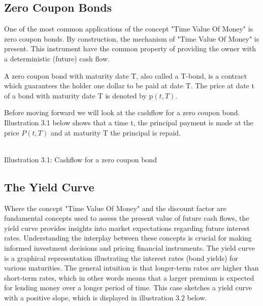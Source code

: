 \subsection{Zero Coupon Bonds}
One of the most common applications of the concept "Time Value Of Money" is zero coupon bonds. 
By construction, the mechanism of "Time Value Of Money" is present. This instrument 
have the common property of providing the owner with a deterministic (future) cash flow. 
\begin{definition}\label{def:zcb}
    A zero coupon bond with maturity date T, also called a T-bond, is a contract which 
    guarantees the holder one dollar to be paid at date T. The price at date t of 
    a bond with maturity date T is denoted by p$(t,T)$. \cite{Bjork} 
\end{definition} 
\noindent
Before moving forward we will look at the cashflow for a zero coupon bond. Illustration  3.1 below shows that a time t,
the principal payment is made at the price $P(t,T)$ and at maturity T the principal is repaid.
\begin{center}
    \\[10pt] 
    Illustration 3.1: Cashflow for a zero coupon bond
\end{center}

\subsection{The Yield Curve}
Where the concept "Time Value Of Money" and the discount factor are fundamental concepts used to assess the present value of future
cash flows, the yield curve provides insights into market expectations regarding future interest rates.
Understanding the interplay between these concepts is crucial for making informed investment decisions and pricing
financial instruments. The yield curve is a graphical representation illustrating the interest rates (bond yields) for various maturities.
The general intuition is that longer-term rates are higher than short-term rates, which in other words means that a
larger premium is expected for lending money over a longer period of time. This case sketches a yield curve with a 
positive slope, which is displayed in illustration 3.2 below.

